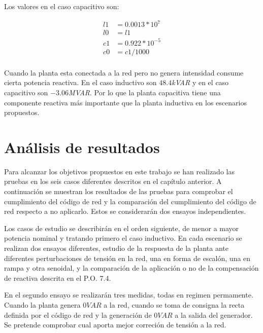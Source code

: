 \documentclass{book}
\begin{document}
Los valores en el caso capacitivo son: 

\begin{equation}
\begin{split}
l1 & =0.0013*10^{7} \\
l0 & =l1\\
c1 & =0.922*10^{-5} \\
c0 & =c1/1000 \\
\end{split}
\end{equation}

Cuando la planta esta conectada a la red pero no genera intensidad consume cierta potencia reactiva. En el caso inductivo son $48.4$\emph{kVAR} y en el caso capacitivo son $-3.06$\emph{MVAR}. Por lo que la planta capacitiva tiene una componente reactiva m\'as importante que la planta inductiva en los escenarios propuestos. \par



\chapter{An\'alisis de resultados}

Para alcanzar los objetivos propuestos en este trabajo se han realizado las pruebas en los seis casos diferentes descritos en el cap\'itulo anterior. A continuaci\'on se muestran los resultados de las pruebas para comprobar el cumplimiento del c\'odigo de red y la comparaci\'on del cumplimiento del c\'odigo de red respecto a no aplicarlo. Estos se considerar\'an dos ensayos independientes. \par

Los casos de estudio se describir\'an en el orden siguiente, de menor a mayor potencia nominal y tratando primero el caso inductivo. En cada escenario se realizan dos ensayos diferentes, estudio de la respuesta de la planta ante diferentes perturbaciones de tensi\'on en la red, una en forma de escalón, una en rampa y otra senoidal, y la comparaci\'on de la aplicaci\'on o no de la compensaci\'on de reactiva descrita en el P.O. 7.4.\par

En el segundo ensayo se realizar\'an tres medidas, todas en regimen permamente. Cuando la planta genera $0 VAR$ a la red, cuando se toma de consigna la recta definida por el c\'odigo de red y la generaci\'on de $0VAR$ a la salida  del generador. Se pretende comprobar cual aporta mejor correci\'on de tensi\'on a la red. \par 
\end{document}

